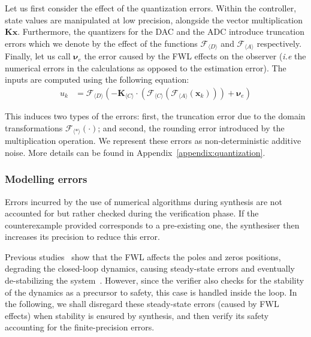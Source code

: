 \documentclass[sigconf]{llncs}
\newcommand{\mat}[1]{\boldsymbol{#1}}
\renewcommand{\vec}[1]{\boldsymbol{#1}}
\begin{document}
Let us first consider the effect of the quantization errors. 
Within the controller, state values are manipulated at low precision,
alongside the vector multiplication $\mat{K}\vec{x}$.
Furthermore, 
the quantizers for the DAC and the ADC introduce truncation errors
which we denote by the effect of the functions $\mathcal{F}_{\langle D \rangle}$
and $\mathcal{F}_{\langle A \rangle}$ respectively. Finally, let us call $\vec{\nu}_e$ the
error caused by the FWL effects on the observer (\emph{i.e} the numerical errors 
in the calculations as opposed to the estimation error).
The inputs are computed using the following equation: 
%
\begin{align}
u_{k}&=\mathcal{F}_{\langle D \rangle}\left(-\mat{K}_{\langle C \rangle}\cdot\left(\mathcal{F}_{\langle C \rangle}\left(\mathcal{F}_{\langle A \rangle}(\vec{x}_{k})\right)\right) +\vec{\nu}_e\right)
\label{eq:uk}
\end{align}

This induces two types of the errors: first, the truncation
error due to the domain transformations $\mathcal{F}_{\langle *
\rangle}(\cdot)$; and second, the rounding error introduced by the
multiplication operation.  We represent these errors as non-deterministic
additive noise. More details can be found in Appendix~\ref{appendix:quantization}.

\subsubsection{Modelling errors}

Errors incurred by the use of numerical algorithms during synthesis are not
accounted for but rather checked during the verification phase.  If the
counterexample provided corresponds to a pre-existing one, the synthesiser
then increases its precision to reduce this error.

Previous studies~\cite{gangli1} show that the FWL affects the poles and
zeros positions, degrading the closed-loop dynamics, causing steady-state
errors and eventually de-stabilizing the system~\cite{Bessa16}.  However,
since the verifier also checks for the stability of the dynamics as a
precursor to safety, this case is handled inside the loop.  In the
following, we shall disregard these steady-state errors (caused by FWL
effects) when stability is ensured by synthesis, and then verify its safety
accounting for the finite-precision errors.
\end{document}
